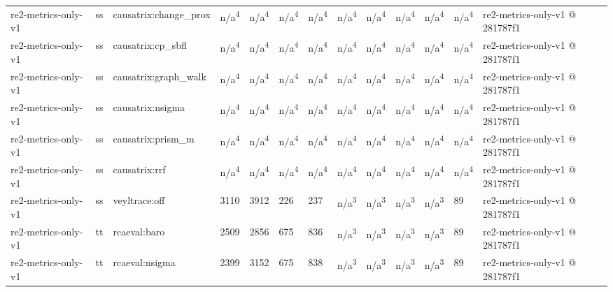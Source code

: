 \begin{table}[t]
\begin{tabular}{lllllllllllll}
re2-metrics-only-v1 & ss & causatrix:change\_prox & n/a\textsuperscript{4} & n/a\textsuperscript{4} & n/a\textsuperscript{4} & n/a\textsuperscript{4} & n/a\textsuperscript{4} & n/a\textsuperscript{4} & n/a\textsuperscript{4} & n/a\textsuperscript{4} & n/a\textsuperscript{4} & re2-metrics-only-v1 @ 281787f1 \\
re2-metrics-only-v1 & ss & causatrix:cp\_sbfl & n/a\textsuperscript{4} & n/a\textsuperscript{4} & n/a\textsuperscript{4} & n/a\textsuperscript{4} & n/a\textsuperscript{4} & n/a\textsuperscript{4} & n/a\textsuperscript{4} & n/a\textsuperscript{4} & n/a\textsuperscript{4} & re2-metrics-only-v1 @ 281787f1 \\
re2-metrics-only-v1 & ss & causatrix:graph\_walk & n/a\textsuperscript{4} & n/a\textsuperscript{4} & n/a\textsuperscript{4} & n/a\textsuperscript{4} & n/a\textsuperscript{4} & n/a\textsuperscript{4} & n/a\textsuperscript{4} & n/a\textsuperscript{4} & n/a\textsuperscript{4} & re2-metrics-only-v1 @ 281787f1 \\
re2-metrics-only-v1 & ss & causatrix:nsigma & n/a\textsuperscript{4} & n/a\textsuperscript{4} & n/a\textsuperscript{4} & n/a\textsuperscript{4} & n/a\textsuperscript{4} & n/a\textsuperscript{4} & n/a\textsuperscript{4} & n/a\textsuperscript{4} & n/a\textsuperscript{4} & re2-metrics-only-v1 @ 281787f1 \\
re2-metrics-only-v1 & ss & causatrix:prism\_m & n/a\textsuperscript{4} & n/a\textsuperscript{4} & n/a\textsuperscript{4} & n/a\textsuperscript{4} & n/a\textsuperscript{4} & n/a\textsuperscript{4} & n/a\textsuperscript{4} & n/a\textsuperscript{4} & n/a\textsuperscript{4} & re2-metrics-only-v1 @ 281787f1 \\
re2-metrics-only-v1 & ss & causatrix:rrf & n/a\textsuperscript{4} & n/a\textsuperscript{4} & n/a\textsuperscript{4} & n/a\textsuperscript{4} & n/a\textsuperscript{4} & n/a\textsuperscript{4} & n/a\textsuperscript{4} & n/a\textsuperscript{4} & n/a\textsuperscript{4} & re2-metrics-only-v1 @ 281787f1 \\
re2-metrics-only-v1 & ss & veyltrace:off & 3110 & 3912 & 226 & 237 & n/a\textsuperscript{3} & n/a\textsuperscript{3} & n/a\textsuperscript{3} & n/a\textsuperscript{3} & 89 & re2-metrics-only-v1 @ 281787f1 \\
re2-metrics-only-v1 & tt & rcaeval:baro & 2509 & 2856 & 675 & 836 & n/a\textsuperscript{3} & n/a\textsuperscript{3} & n/a\textsuperscript{3} & n/a\textsuperscript{3} & 89 & re2-metrics-only-v1 @ 281787f1 \\
re2-metrics-only-v1 & tt & rcaeval:nsigma & 2399 & 3152 & 675 & 838 & n/a\textsuperscript{3} & n/a\textsuperscript{3} & n/a\textsuperscript{3} & n/a\textsuperscript{3} & 89 & re2-metrics-only-v1 @ 281787f1 \\

\end{tabular}
\end{table}
